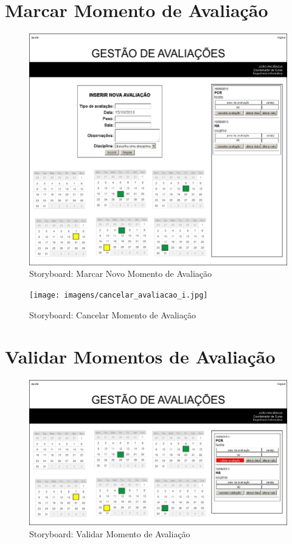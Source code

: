 \clearpage
\section{Marcar Momento de Avaliação}

\begin{figure}[!htbp]
\centering
\includegraphics{imagens/nova_avaliacao_i.jpg}
\caption{Storyboard: Marcar Novo Momento de Avaliação}
\label{fig:nova_avaliacao_i}
\end{figure}

\begin{figure}[!htbp]
\centering
\texttt{[image: imagens/cancelar\_avaliacao\_i.jpg]}
\caption{Storyboard: Cancelar Momento de Avaliação}
\label{fig:cancelar_avaliacao_i}
\end{figure}

\clearpage
\section{Validar Momentos de Avaliação}

\begin{figure}[!htbp]
\centering
\includegraphics{imagens/validar_avaliacao_i.jpg}
\caption{Storyboard: Validar Momento de Avaliação}
\label{fig:validar_avaliacao_i}
\end{figure}

